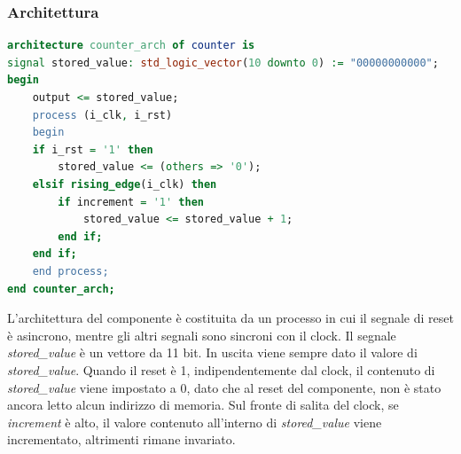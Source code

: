\documentclass[12pt,a4paper]{scrartcl}
\begin{document}
        \subsubsection{Architettura}
            \begin{lstlisting}[language=VHDL]
architecture counter_arch of counter is
signal stored_value: std_logic_vector(10 downto 0) := "00000000000";
begin
    output <= stored_value;
    process (i_clk, i_rst)
    begin
    if i_rst = '1' then
        stored_value <= (others => '0');
    elsif rising_edge(i_clk) then
        if increment = '1' then
            stored_value <= stored_value + 1;
        end if;
    end if;
    end process;
end counter_arch;
            \end{lstlisting}
            L'architettura del componente è costituita da un processo in cui il segnale di reset è asincrono, mentre gli altri segnali sono sincroni con il clock.
            \newline Il segnale \textit{stored\_value} è un vettore da 11 bit.
            \newline In uscita viene sempre dato il valore di \textit{stored\_value}.
            \newline Quando il reset è 1, indipendentemente dal clock, il contenuto di \textit{stored\_value} viene impostato a 0, dato che al reset del componente, non è stato ancora letto alcun indirizzo di memoria.
            \newline Sul fronte di salita del clock, se \textit{increment} è alto, il valore contenuto all'interno di \textit{stored\_value} viene incrementato, altrimenti rimane invariato.
\end{document}
